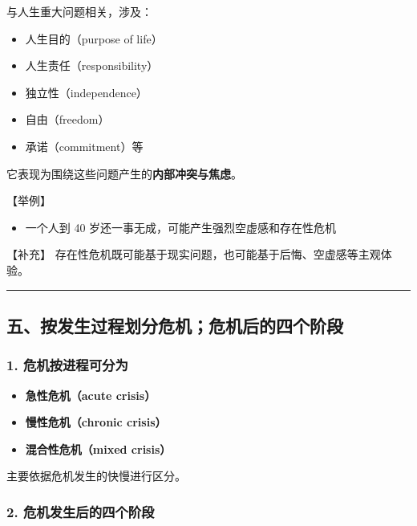 \documentclass[
  chinese,
  9pt,
  a4paper,
]{ctexart}
\providecommand{\tightlist}{%
  \setlength{\itemsep}{0pt}\setlength{\parskip}{0pt}}
\begin{document}
与人生重大问题相关，涉及：

\begin{itemize}
\tightlist
\item
  人生目的（purpose of life）
\item
  人生责任（responsibility）
\item
  独立性（independence）
\item
  自由（freedom）
\item
  承诺（commitment）等
\end{itemize}

它表现为围绕这些问题产生的\textbf{内部冲突与焦虑}。

【举例】

\begin{itemize}
\tightlist
\item
  一个人到 40 岁还一事无成，可能产生强烈空虚感和存在性危机
\end{itemize}

【补充】
存在性危机既可能基于现实问题，也可能基于后悔、空虚感等主观体验。

\begin{center}\rule{0.5\linewidth}{0.5pt}\end{center}

\subsection{五、按发生过程划分危机；危机后的四个阶段}\label{ux4e94ux6309ux53d1ux751fux8fc7ux7a0bux5212ux5206ux5371ux673aux5371ux673aux540eux7684ux56dbux4e2aux9636ux6bb5}

\subsubsection{1.
危机按进程可分为}\label{ux5371ux673aux6309ux8fdbux7a0bux53efux5206ux4e3a}

\begin{itemize}
\tightlist
\item
  \textbf{急性危机（acute crisis）}
\item
  \textbf{慢性危机（chronic crisis）}
\item
  \textbf{混合性危机（mixed crisis）}
\end{itemize}

主要依据危机发生的快慢进行区分。

\subsubsection{2.
危机发生后的四个阶段}\label{ux5371ux673aux53d1ux751fux540eux7684ux56dbux4e2aux9636ux6bb5}
\end{document}
